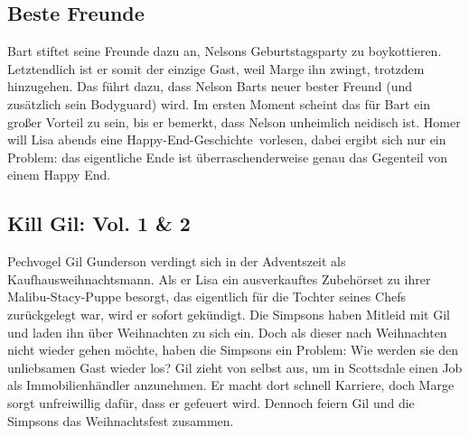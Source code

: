 \subsection{Beste Freunde}
Bart stiftet seine Freunde dazu an, Nelsons Geburtstagsparty zu boykottieren. Letztendlich ist er somit der einzige Gast, weil Marge ihn zwingt, trotzdem hinzugehen. Das führt dazu, dass Nelson Barts neuer bester Freund (und zusätzlich sein Bodyguard) wird. Im ersten Moment scheint das für Bart ein großer Vorteil zu sein, bis er bemerkt, dass Nelson unheimlich neidisch ist. Homer will Lisa abends eine \glqq Happy-End-Geschichte\grqq\ vorlesen, dabei ergibt sich nur ein Problem: das eigentliche Ende ist überraschenderweise genau das Gegenteil von einem \glqq Happy End\grqq .


\subsection{Kill Gil: Vol. 1 \& 2}\label{JABF01}
Pechvogel Gil Gunderson verdingt sich in der Adventszeit als Kaufhausweihnachtsmann. Als er Lisa ein ausverkauftes Zubehörset zu ihrer Malibu-Stacy-Puppe besorgt, das eigentlich für die Tochter seines Chefs zurückgelegt war, wird er sofort gekündigt. Die Simpsons haben Mitleid mit Gil und laden ihn über Weihnachten zu sich ein. Doch als dieser nach Weihnachten nicht wieder gehen möchte, haben die Simpsons ein Problem: Wie werden sie den unliebsamen Gast wieder los? Gil zieht von selbst aus, um in Scottsdale einen Job als Immobilienhändler anzunehmen. Er macht dort schnell Karriere, doch Marge sorgt unfreiwillig dafür, dass er gefeuert wird. Dennoch feiern Gil und die Simpsons das Weihnachtsfest zusammen.



